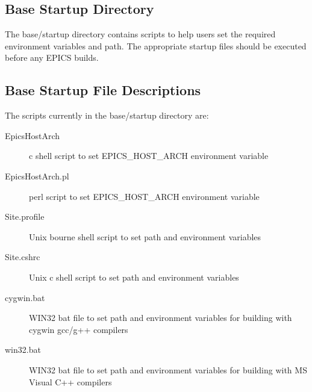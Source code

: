 \subsection{Base Startup Directory}

The base/startup directory contains scripts to help users set the required environment variables and path. The appropriate 
startup files should be executed before any EPICS builds.

\subsection{Base Startup File Descriptions}

The scripts currently in the base/startup directory are:

\begin{description}

\item[EpicsHostArch]

c shell script to set EPICS\_HOST\_ARCH environment variable

\item[EpicsHostArch.pl]

perl script to set EPICS\_HOST\_ARCH environment variable

\item[Site.profile]

Unix bourne shell script to set path and environment variables

\item[Site.cshrc]

Unix c shell script to set path and environment variables

\item[cygwin.bat]

WIN32 bat file to set path and environment variables for building with cygwin gcc/g++ compilers

\item[win32.bat]

WIN32 bat file to set path and environment variables for building with MS Visual C++ compilers

\end{description}








